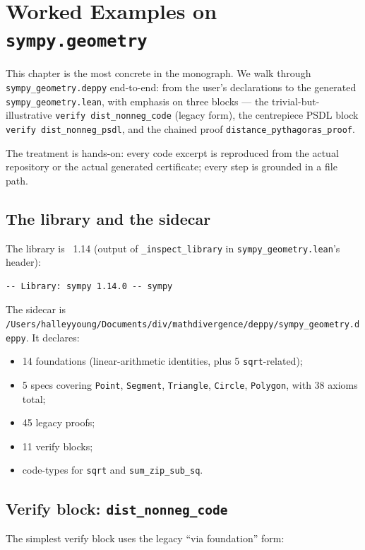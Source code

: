 \chapter{Worked Examples on \texttt{sympy.geometry}}
\label{ch:examples}

This chapter is the most concrete in the monograph.  We walk through
\texttt{sympy\_geometry.deppy} end-to-end: from the user's
declarations to the generated \texttt{sympy\_geometry.lean}, with
emphasis on three blocks --- the trivial-but-illustrative
\texttt{verify dist\_nonneg\_code} (legacy form), the centrepiece
PSDL block \texttt{verify dist\_nonneg\_psdl}, and the chained
proof \texttt{distance\_pythagoras\_proof}.

The treatment is hands-on: every code excerpt is reproduced from
the actual repository or the actual generated certificate; every
step is grounded in a file path.

\section{The library and the sidecar}

The library is \Sympy{}~1.14 (output of
\texttt{\_inspect\_library} in
\texttt{sympy\_geometry.lean}'s header):
\begin{lstlisting}[language=lean4]
-- Library: sympy 1.14.0 -- sympy
\end{lstlisting}

The sidecar is
\texttt{/Users/halleyyoung/Documents/div/mathdivergence/deppy/sympy\_geometry.deppy}.
It declares:
\begin{itemize}[leftmargin=1.7em]
  \item 14 foundations (linear-arithmetic identities, plus 5
    \texttt{sqrt}-related);
  \item 5 specs covering \texttt{Point}, \texttt{Segment},
    \texttt{Triangle}, \texttt{Circle}, \texttt{Polygon}, with 38
    axioms total;
  \item 45 legacy proofs;
  \item 11 verify blocks;
  \item code-types for \texttt{sqrt} and \texttt{sum\_zip\_sub\_sq}.
\end{itemize}

\section{Verify block: \texttt{dist\_nonneg\_code}}

The simplest verify block uses the legacy ``via foundation'' form:

